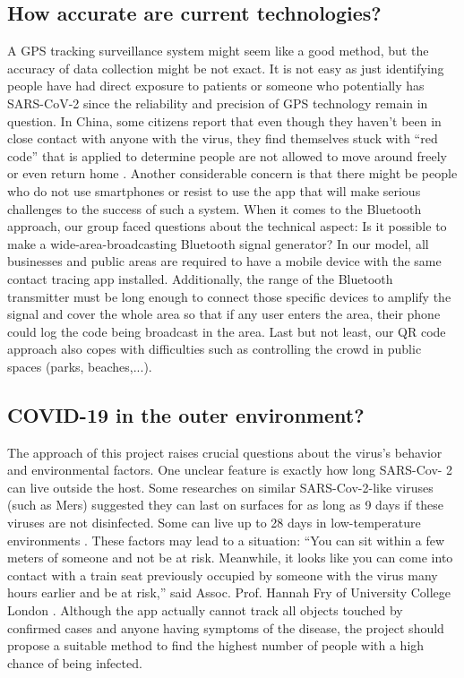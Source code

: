   \subsection{How accurate are current technologies?}
    \par A GPS tracking surveillance system might seem like a good method, but the accuracy of data collection might be not exact. It is not easy as just identifying people have had direct exposure to patients or someone who potentially has SARS-CoV-2 since the reliability and precision of GPS technology remain in question. In China, some citizens report that even though they haven’t been in close contact with anyone with the virus, they find themselves stuck with “red code” that is applied to determine people are not allowed to move around freely or even return home \parencite{Questions2}. Another considerable concern is that there might be people who do not use smartphones or resist to use the app that will make serious challenges to the success of such a system. When it comes to the Bluetooth approach, our group faced questions about the technical aspect: Is it possible to make a wide-area-broadcasting Bluetooth signal generator? In our model, all businesses and public areas are required to have a mobile device with the same contact tracing app installed. Additionally, the range of the Bluetooth transmitter must be long enough to connect those specific devices to amplify the signal and cover the whole area so that if any user enters the area, their phone could log the code being broadcast in the area. Last but not least, our QR code approach also copes with difficulties such as controlling the crowd in public spaces (parks, beaches,...).
  \subsection{COVID-19 in the outer environment?}
    \par The approach of this project raises crucial questions about the virus’s behavior and environmental factors. One unclear feature is exactly how long SARS-Cov- 2 can live outside the host. Some researches on similar SARS-Cov-2-like viruses (such as Mers) suggested they can last on surfaces for as long as 9 days if these viruses are not disinfected. Some can live up to 28 days in low-temperature environments \parencite{Questions3}. These factors may lead to a situation: “You can sit within a few meters of someone and not be at risk. Meanwhile, it looks like you can come into contact with a train seat previously occupied by someone with the virus many hours earlier and be at risk,” said Assoc. Prof. Hannah Fry of University College London \parencite{Questions4}. Although the app actually cannot track all objects touched by confirmed cases and anyone having symptoms of the disease, the project should propose a suitable method to find the highest number of people with a high chance of being infected.
